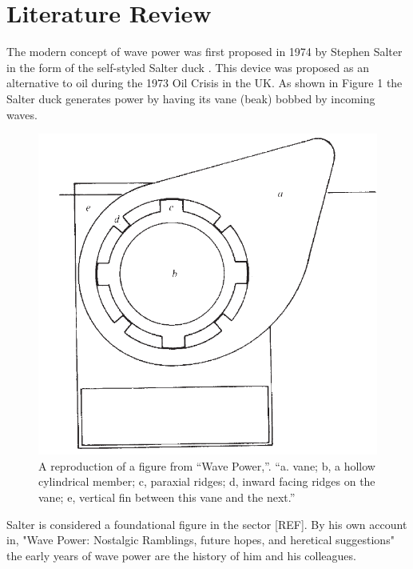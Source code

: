 \documentclass{report}
\begin{document}
\chapter{Literature Review}
The modern concept of wave power was first proposed in 1974 by Stephen Salter in the form of the self-styled Salter duck \cite{salterDuck}. This device was proposed as an alternative to oil during the 1973 Oil Crisis in the UK. As shown in Figure 1 the Salter duck generates power by having its vane (beak) bobbed by incoming waves.

\begin{figure}
\centering
\label{fig:duck}
\includegraphics[scale=0.25]{graphics/duck}
\caption{A reproduction of a figure from “Wave Power,”\cite{salterDuck}. “a. vane; b, a hollow cylindrical member; c, paraxial ridges; d, inward facing ridges on the vane; e, vertical fin between this vane and the next.”}
\end{figure}

Salter is considered a foundational figure in the sector [REF]. By his own account in, "Wave Power: Nostalgic Ramblings, future hopes, and heretical suggestions" \cite{salterRamble} the early years of wave power are the history of him and his colleagues.
\end{document}
